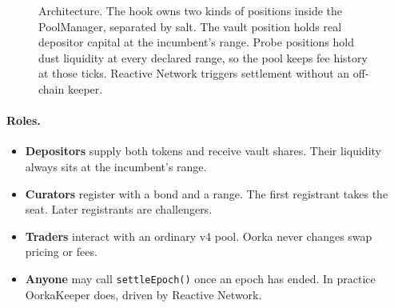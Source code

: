 \documentclass[11pt,a4paper]{article}
\newcommand{\code}[1]{\texttt{\small #1}}
\begin{document}
\begin{figure}[h]
{}
\caption{Architecture. The hook owns two kinds of positions inside the PoolManager, separated by salt. The vault position holds real depositor capital at the incumbent's range. Probe positions hold dust liquidity at every declared range, so the pool keeps fee history at those ticks. Reactive Network triggers settlement without an off-chain keeper.}
\label{fig:arch}
\end{figure}

\paragraph{Roles.}
\begin{itemize}
  \item \textbf{Depositors} supply both tokens and receive vault shares. Their liquidity always sits at the incumbent's range.
  \item \textbf{Curators} register with a bond and a range. The first registrant takes the seat. Later registrants are challengers.
  \item \textbf{Traders} interact with an ordinary v4 pool. Oorka never changes swap pricing or fees.
  \item \textbf{Anyone} may call \code{settleEpoch()} once an epoch has ended. In practice OorkaKeeper does, driven by Reactive Network.
\end{itemize}
\end{document}
